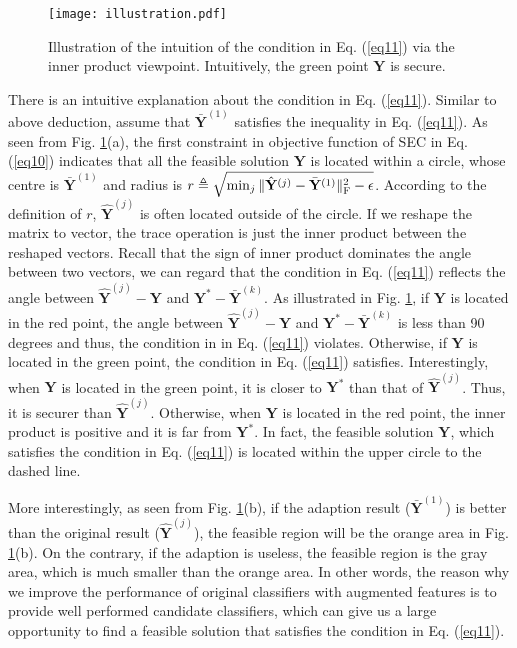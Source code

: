 \documentclass[10pt,journal,compsoc]{IEEEtran}
\begin{document}
\begin{figure}[!t]
\centering
\texttt{[image: illustration.pdf]}
\caption{Illustration of the intuition of the condition in Eq. (\ref{eq11}) via the inner product viewpoint. Intuitively, the green point $\mathbf{Y}$ is secure.}
\label{fig_illustration}
\vskip -0.15in
\end{figure}

There is an intuitive explanation about the condition in Eq. (\ref{eq11}). Similar to above deduction, assume that $\bar{\mathbf{Y}}^{(1)}$ satisfies the inequality in Eq. (\ref{eq11}). As seen from Fig. \ref{fig_illustration}(a), the first constraint in objective function of SEC in Eq. (\ref{eq10}) indicates that all the feasible solution $\mathbf{Y}$ is located within a circle, whose centre is $\bar{\mathbf{Y}}^{(1)}$ and radius is  $r \triangleq \sqrt{\min_j \|\hat{\mathbf{Y}}^{(j)}- \bar{\mathbf{Y}}^{(1)}\|_{\rm{F}}^2-\epsilon}$. According to the definition of $r$, $\hat{\mathbf{Y}}^{(j)}$ is often located outside of the circle. If we reshape the matrix to vector, the trace operation is just the inner product between the reshaped vectors. Recall that the sign of inner product dominates the angle between two vectors, we can regard that the condition in Eq. (\ref{eq11}) reflects the angle between $\hat{\mathbf{Y}}^{(j)}-\mathbf{Y}$ and $ \mathbf{Y}^{*}-\bar{\mathbf{Y}}^{(k)}$. As illustrated in Fig. \ref{fig_illustration}, if $\mathbf{Y}$ is located in the red point, the angle between $\hat{\mathbf{Y}}^{(j)}-\mathbf{Y}$ and $ \mathbf{Y}^{*}-\bar{\mathbf{Y}}^{(k)}$ is less than 90 degrees and thus, the condition in in Eq. (\ref{eq11}) violates. Otherwise, if $\mathbf{Y}$ is located in the green point, the condition in Eq. (\ref{eq11}) satisfies. Interestingly, when $\mathbf{Y}$ is located in the green point, it is closer to $\mathbf{Y}^{*}$ than that of $\hat{\mathbf{Y}}^{(j)}$. Thus, it is securer than $\hat{\mathbf{Y}}^{(j)}$. Otherwise, when $\mathbf{Y}$ is located in the red point, the inner product is positive and it is far from $\mathbf{Y}^{*}$. In fact, the feasible solution $\mathbf{Y}$, which satisfies the condition in Eq. (\ref{eq11}) is located within the upper circle to the dashed line.

More interestingly, as seen from Fig. \ref{fig_illustration}(b), if the adaption result ($\bar{\mathbf{Y}}^{(1)}$) is better than the original result ($\hat{\mathbf{Y}}^{(j)}$), the feasible region will be the orange area in Fig. \ref{fig_illustration}(b). On the contrary, if the adaption is useless, the feasible region is the gray area, which is much smaller than the orange area. In other words, the reason why we improve the performance of original classifiers with augmented features is to provide well performed candidate classifiers, which can give us a large opportunity to find a feasible solution that satisfies the condition in Eq. (\ref{eq11}).
\end{document}
